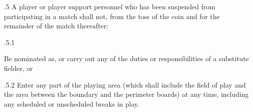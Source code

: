 \documentclass[12pt]{article}
\begin{document}
\vspace{\baselineskip}
\begin{adjustwidth}{0.5in}{0.11in}
{\fontsize{9pt}{10.8pt}.5 \tabto{0.49in} A player or player support personnel who has been suspended from participating in a match shall not, from the toss of the coin and for the remainder of the match thereafter:\par}\par

\end{adjustwidth}


\vspace{\baselineskip}
\begin{adjustwidth}{0.49in}{0.0in}
{\fontsize{9pt}{10.8pt}.5.1 \tabto{1.17in} {\fontsize{8pt}{9.6pt}\selectfont Be nominated as, or carry out any of the duties or responsibilities of a substitute fielder, or\par}\par}\par

\end{adjustwidth}


\vspace{\baselineskip}

\vspace{\baselineskip}

\vspace{\baselineskip}

\vspace{\baselineskip}
\begin{adjustwidth}{0.0in}{-0.01in}
\begin{Center}
{\fontsize{8pt}{9.6pt}\par}
\end{Center}\par

\end{adjustwidth}


\vspace{\baselineskip}

\vspace{\baselineskip}
\begin{adjustwidth}{1.18in}{0.03in}
{\fontsize{9pt}{10.8pt}.5.2 \tabto{1.17in} Enter any part of the playing area (which shall include the field of play and the area between the boundary and the perimeter boards) at any time, including any scheduled or unscheduled breaks in play.\par}\par

\end{adjustwidth}
\end{document}
